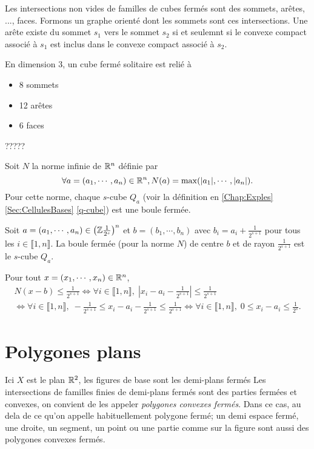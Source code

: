 Les intersections non vides de familles de cubes fermés sont des sommets, arêtes, ..., faces. Formons un graphe orienté dont les sommets sont ces intersections. Une arête existe du sommet $s_1$ vers le sommet $s_2$ si et seulemnt si le convexe compact associé à $s_1$ est inclus dans le convexe compact associé à $s_2$.

En dimension 3, un cube fermé solitaire est relié à
\begin{itemize}
 \item 8 sommets
 \item 12 arêtes
 \item 6 faces
\end{itemize}
?????

Soit $N$ la norme infinie de $\mathbb{R}^n$ définie par
\begin{displaymath}
 \forall a =(a_1, \cdots, a_n) \in \mathbb{R}^n, N(a) = \max(|a_1|, \cdots ,|a_n|).
\end{displaymath}
Pour cette norme, chaque $s$-cube $Q_a$ (voir la définition en \ref{Chap:Exples}\ref{Sec:CellulesBases} \ref{q-cube}) est une boule fermée.
\begin{propn}
Soit $a =(a_1, \cdots, a_n) \in \left(\mathbb{Z}\frac{1}{2^s}\right)^n$ et $b=(b_1,\cdots,b_n)$ avec $b_i = a_i + \frac{1}{2^{s+1}}$ pour tous les $i\in \llbracket 1,n\rrbracket$.\newline
La boule fermée (pour la norme $N$) de centre $b$ et de rayon $\frac{1}{2^{s+1}}$ est le $s$-cube $Q_a$.
\end{propn}
\begin{demo}
 Pour tout $x =(x_1, \cdots, x_n) \in \mathbb{R}^n$,
\begin{multline*}
 N(x-b)\leq \frac{1}{2^{s+1}}
 \Leftrightarrow
 \forall i \in \llbracket 1, n\rrbracket, \; \left|x_i - a_i - \frac{1}{2^{s+1}} \right| \leq \frac{1}{2^{s+1}} \\
 \Leftrightarrow
 \forall i \in \llbracket 1, n\rrbracket, \; -\frac{1}{2^{s+1}} \leq x_i - a_i - \frac{1}{2^{s+1}} \leq \frac{1}{2^{s+1}}
 \Leftrightarrow
 \forall i \in \llbracket 1, n\rrbracket, \; 0 \leq x_i - a_i \leq \frac{1}{2^{s}}.
\end{multline*}
\end{demo}


\section{Polygones plans}\label{ExplePolyg}
Ici $X$ est le plan $\mathbb{R}^2$, les figures de base sont les demi-plans fermés Les intersections de familles finies de demi-plans fermés sont des parties fermées et convexes, on convient de les appeler \emph{polygones convexes fermés}. Dans ce cas, au dela de ce qu'on appelle habituellement polygone fermé; un demi espace fermé, une droite, un segment, un point ou une partie comme sur la figure sont aussi des polygones convexes fermés.

